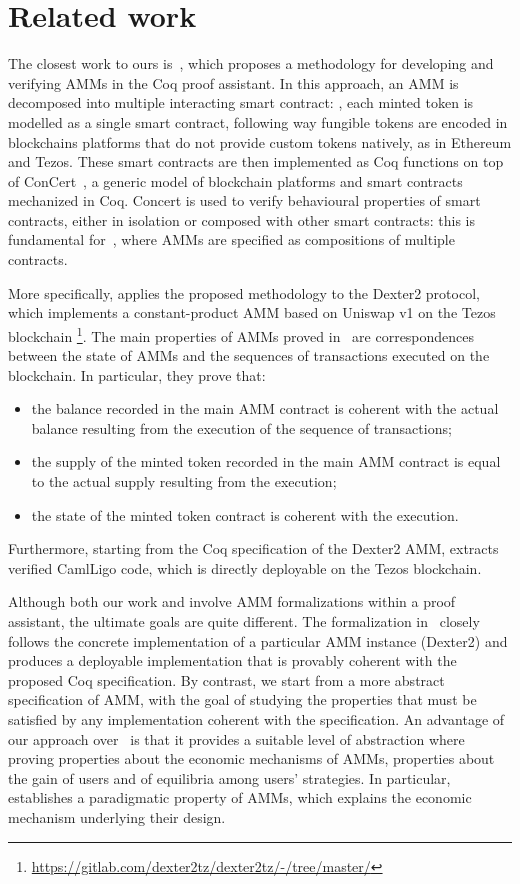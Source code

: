 \section{Related work}
\label{sec:related}

The closest work to ours is~\cite{Nielsen23cpp},
which proposes a methodology for developing and verifying AMMs in the Coq proof assistant. 
In this approach, an AMM is decomposed into multiple interacting smart contract:
\eg, each minted token is modelled as a single smart contract,
following way fungible tokens are encoded 
in blockchains platforms that do not provide custom tokens natively,
as \eg in Ethereum and Tezos.
These smart contracts are then implemented as Coq functions on top of 
ConCert~\cite{Annenkov20cpp}, a generic model of blockchain platforms and smart contracts mechanized in Coq.
Concert is used to verify behavioural properties of smart contracts,
either in isolation or composed with other smart contracts:
this is fundamental for~\cite{Nielsen23cpp}, 
where AMMs are specified as compositions of multiple contracts. 

More specifically, \cite{Nielsen23cpp} applies the proposed methodology to the Dexter2 protocol, which implements a constant-product AMM based on Uniswap v1
on the Tezos blockchain%
\footnote{\url{https://gitlab.com/dexter2tz/dexter2tz/-/tree/master/}}.
The main properties of AMMs proved in~\cite{Nielsen23cpp} are correspondences
between the state of AMMs and the sequences of transactions executed on the blockchain.
In particular, they prove that:
\begin{itemize}
\item the balance recorded in the main AMM contract is coherent with the actual balance resulting from the execution of the sequence of transactions;
\item the supply of the minted token recorded in the main AMM contract is equal to the actual supply resulting from the execution;
\item the state of the minted token contract is coherent with the execution.
\end{itemize}
Furthermore, starting from the Coq specification of the Dexter2 AMM, \cite{Nielsen23cpp} 
extracts verified CamlLigo code, which is directly deployable on the Tezos blockchain. 

Although both our work and \cite{Nielsen23cpp} involve AMM formalizations within a proof assistant, the ultimate goals are quite different. 
The formalization in~\cite{Nielsen23cpp} closely follows the concrete implementation of a particular AMM instance (Dexter2) and produces a deployable implementation 
that is provably coherent with the proposed Coq specification. 
By contrast, we start from a more abstract specification of AMM,
with the goal of studying the properties that must be satisfied by any implementation coherent with the specification.
%
An advantage of our approach over~\cite{Nielsen23cpp} is that it provides a suitable level of abstraction where proving properties about the economic mechanisms of AMMs,
\ie properties about the gain of users and of equilibria among users' strategies.
In particular,  establishes a paradigmatic property of AMMs, which explains the economic mechanism underlying their design.

